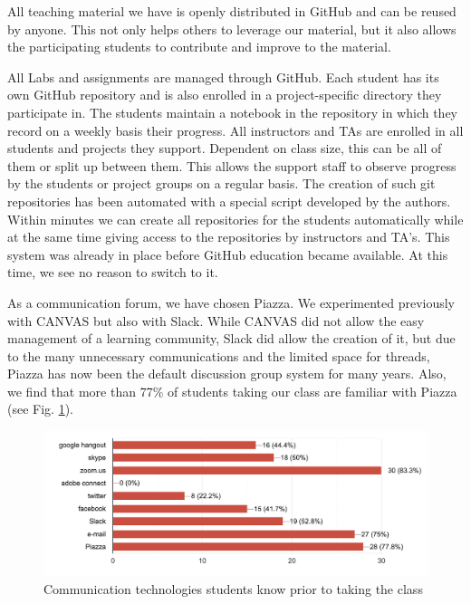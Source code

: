 \documentclass[conference]{IEEEtran}
\begin{document}
All teaching material we have is openly distributed in GitHub and can be reused by anyone. This not only helps others to leverage our material, but it also allows the participating students to contribute and improve to the material.

All Labs and assignments are managed through GitHub. Each student has its own GitHub repository and is also enrolled in a project-specific directory they participate in. The students maintain a notebook in the repository in which they record on a weekly basis their progress.  All instructors and TAs are enrolled in all students and projects they support. Dependent on class size, this can be all of them or split up between them. This allows the support staff to observe progress by the students or project groups on a regular basis. The creation of such git repositories has been automated with a special script developed by the authors. Within minutes we can create all repositories for the students automatically while at the same time giving access to the repositories by instructors and TA's. This system was already in place before GitHub education became available. At this time, we see no reason to switch to it.

As a communication forum, we have chosen Piazza. We experimented previously with CANVAS but also with Slack. While CANVAS did not allow the easy management of a learning community, Slack did allow the creation of it, but due to the many unnecessary communications and the limited space for threads, Piazza has now been the default discussion group system for many years. Also, we find that more than 77\% of students taking our class are familiar with Piazza (see Fig. \ref{fig:tech}).

\begin{figure}[htb]
  \caption{Communication technologies students know prior to taking the class}\label{fig:tech}
  \centering
    \includegraphics[width=0.9\columnwidth]{images/technologies.png}

\end{figure}
\end{document}
